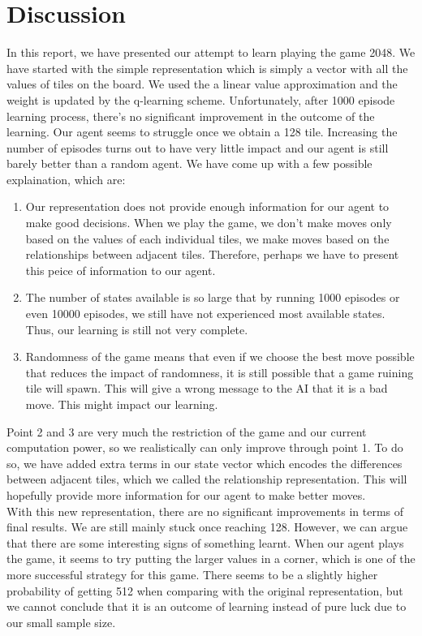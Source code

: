 \section{Discussion}
In this report, we have presented our attempt to learn playing the game 2048. We have started with the simple representation which is simply a vector with all the values of tiles on the board. We used the a linear value approximation and the weight is updated by the q-learning scheme. Unfortunately, after 1000 episode learning process, there's no significant improvement in the outcome of the learning. Our agent seems to struggle once we obtain a 128 tile. Increasing the number of episodes turns out to have very little impact and our agent is still barely better than a random agent. We have come up with a few possible explaination, which are:
\\
\begin{enumerate}
	\item Our representation does not provide enough information for our agent to make good decisions. When we play the game, we don't make moves only based on the values of each individual tiles, we make moves based on the relationships between adjacent tiles. Therefore, perhaps we have to present this peice of information to our agent.
	\item The number of states available is so large that by running 1000 episodes or even 10000 episodes, we still have not experienced most available states. Thus, our learning is still not very complete.
	\item Randomness of the game means that even if we choose the best move possible that reduces the impact of randomness,  it is still possible that a game ruining tile will spawn. This will give a wrong message to  the AI that it is a bad move. This might impact our learning.
\end{enumerate}


Point 2 and 3 are very much the restriction of the game and our current computation power, so we realistically can only improve through point 1. To do so, we have added extra terms in our state vector which  encodes the differences between adjacent tiles, which we called the relationship representation. This will hopefully provide more information for our agent to make better moves.
\\

With this new representation, there are no significant improvements in terms of final results. We are still mainly stuck once reaching 128. However, we can argue that there are some interesting signs of something learnt. When our agent plays the game, it seems to try putting the larger values in a corner, which is one of the more successful strategy for this game. There seems to be a slightly higher probability of getting 512 when comparing with the original representation, but we cannot conclude that it is an outcome of learning instead of pure luck due to our small sample size.
\\

